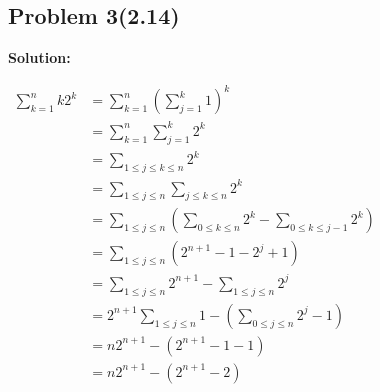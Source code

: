 \subsection{Problem 3(2.14)}
\textbf{}
\par

\begin{flushleft}
\textbf{Solution: }
\par
$\begin{aligned} 
\sum_{k=1}^n k 2^k & =\sum_{k=1}^n\left(\sum_{j=1}^k 1\right)^k \\
& =\sum_{k=1}^n \sum_{j=1}^k 2^k \\
& =\sum_{1 \leq j \leq k \leq n} 2^k \\
& =\sum_{1 \leq j \leq n} \sum_{j \leq k \leq n} 2^k \\
& =\sum_{1 \leq j \leq n}\left(\sum_{0 \leq k \leq n} 2^k-\sum_{0 \leq k \leq j-1} 2^k\right) \\
& =\sum_{1 \leq j \leq n}\left(2^{n+1} -1 -2^j + 1 \right) \\
& =\sum_{1 \leq j \leq n} 2^{n+1}-\sum_{1 \leq j \leq n} 2^j \\
& =2^{n+1} \sum_{1 \leq j \leq n} 1-\left(\sum_{0 \leq j \leq n} 2^j-1\right) \\
& =n 2^{n+1}-\left(2^{n+1}-1-1\right) \\
& =n 2^{n+1}-\left(2^{n+1}-2\right)
\end{aligned}
$
\end{flushleft}